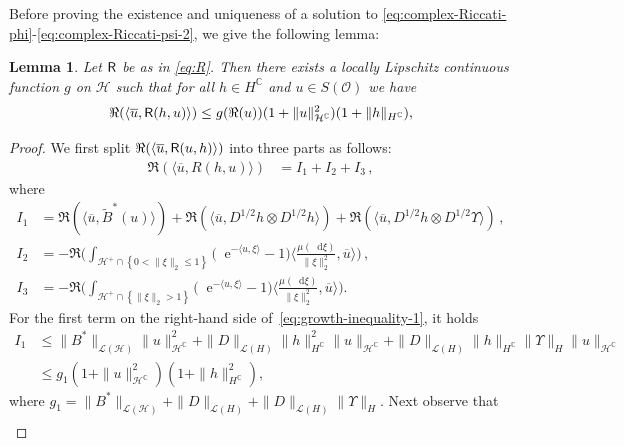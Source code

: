 \documentclass[10pt,a4paper,reqno]{amsart}
\newcommand*\D{\mathop{}\!\mathrm{d}}
\newcommand*\E{\mathop{}\!\mathrm{e}}
\numberwithin{equation}{section}
\newtheorem{lemma}[theorem]{Lemma}
\theoremstyle{plain}
\theoremstyle{definition}
\theoremstyle{example}
\newcommand{\MC}{\mathbb{C}}
\newcommand{\cH}{\mathcal{H}}
\newcommand{\cL}{\mathcal{L}}
\newcommand{\cO}{\mathcal{O}}
\newcommand{\set}[1]{\left\{ #1\right\}}
\newcommand{\norm}[1]{\|#1\|}
\newcommand{\cHplus}{\cH^{+}}
\begin{document}
Before proving the existence and uniqueness of a solution to \eqref{eq:complex-Riccati-phi}-\eqref{eq:complex-Riccati-psi-2}, we give the following
lemma: 
\begin{lemma}\label{lem:growth-inequality}
Let ${\sf R}$ be as in \eqref{eq:R}. Then there exists a locally Lipschitz continuous function $g$ on $\cH$ such that
for all $h\in H^{\MC}$ and $u\in S(\cO)$ we have
\begin{align}\label{eq:growth-inequality}
  \Re(\langle \overline{u} , {\sf R}(h,u)\rangle)\leq g(\Re(u))(1+\norm{u}_{\cH^{\mathbb{C}}}^{2})(1+\norm{h}_{H^{\mathbb{C}}}),
\end{align}
\end{lemma}
\begin{proof}
  We first split $\Re(\langle \overline{u} , {\sf R}(u,h)\rangle)$ into three parts as follows:
  \begin{align}\label{eq:growth-inequality-1}
   \Re(\langle \overline{u},R(h,u)\rangle)&= I_1 + I_2+ I_3\,,
   \end{align}
   where
   \begin{align*}
   I_1&=  \Re(\langle \overline{u},
    \tilde{B}^{*}(u)\rangle)+\Re(\langle \overline{u}, D^{1/2}h\otimes D^{1/2}h\rangle) + \Re(\langle \overline{u}, D^{1/2}h\otimes D^{1/2}\Upsilon \rangle)\,, \\
    I_2 &= -\Re\Big(\int_{\cHplus\cap\set{0<\norm{\xi}_2\leq 1}}\big(\E^{-\langle
      u,\xi\rangle}-1\big)\langle\frac{\mu(\D\xi)}{\norm{\xi}_2^{2}},\overline{u}\rangle\Big)\,,\\
    I_3 &=  -\Re\Big(\int_{\cHplus\cap\set{\norm{\xi}_2>1}}\big(\E^{-\langle
      u,\xi\rangle}-1\big)\langle\frac{\mu(\D\xi)}{\norm{\xi}_2^{2}},\overline{u}\rangle\Big).
  \end{align*}
  For the first term on the right-hand side of~\eqref{eq:growth-inequality-1}, it holds
  \begin{align*}
    I_1&\leq
                      \norm{B^{*}}_{\cL(\cH)}\norm{u}^{2}_{\cH^{\mathbb{C}}}+\norm{D}_{\cL(H)}\norm{h}_{H^{\MC}}^{2}\norm{u}_{\cH^{\mathbb{C}}} + \norm{D}_{\cL(H)}\norm{h}_{H^{\MC}}\norm{\Upsilon}_{H}\norm{u}_{\cH^{\mathbb{C}}}\\
                    &\leq g_{1}(1+\norm{u}_{\cH^{\mathbb{C}}}^{2})(1+\norm{h}_{H^{\MC}}^{2}), 
  \end{align*}
  where $g_{1}=\norm{B^{*}}_{\cL(\cH)}+\norm{D}_{\cL(H)} +\norm{D}_{\cL(H)} \norm{\Upsilon}_H$. 
  Next observe that 
  \begin{align}\label{eq:big-jumps}

\end{align}
\end{proof}
\end{document}
